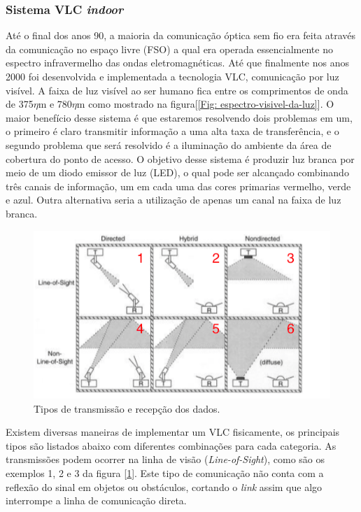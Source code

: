 \subsubsection{Sistema VLC \textit{indoor}}

Até o final dos anos 90, a maioria da comunicação óptica sem fio era feita através da comunicação no espaço livre (FSO) a qual era operada essencialmente no espectro infravermelho das ondas eletromagnéticas. Até que finalmente nos anos 2000 foi desenvolvida e implementada a tecnologia VLC, comunicação por luz visível. A faixa de luz visível ao ser humano fica entre os comprimentos de onda de 375$\eta$m e 780$\eta$m como mostrado na figura[\ref{Fig: espectro-visivel-da-luz}]. O maior benefício desse sistema é que estaremos resolvendo dois problemas em um, o primeiro é claro transmitir informação a uma alta taxa de transferência, e o segundo problema que será resolvido é a iluminação do ambiente da área de cobertura do ponto de acesso. O objetivo desse sistema é produzir luz branca por meio de um diodo emissor de luz (LED), o qual pode ser alcançado combinando três canais de informação, um em cada uma das cores primarias vermelho, verde e azul. Outra alternativa seria a utilização de apenas um canal na faixa de luz branca. \cite{euntaewon&dongjaeshind.k.jung.2008}


\begin{figure}
	\centering
		\includegraphics[width = 12cm]{figuras/difuso}
	\caption{Tipos de transmissão e recepção dos dados.}
	\label{Fig: difuso}
\end{figure}


Existem diversas maneiras de implementar um VLC fisicamente, os principais tipos são listados abaixo com diferentes combinações para cada categoria.
As transmissões podem ocorrer na linha de visão (\textit{Line-of-Sight}), como são os exemplos 1, 2 e 3 da figura [\ref{Fig: difuso}]. Este tipo de comunicação não conta com a reflexão do sinal em objetos ou obstáculos, cortando o \textit{link} assim que algo interrompe a linha de comunicação direta.

